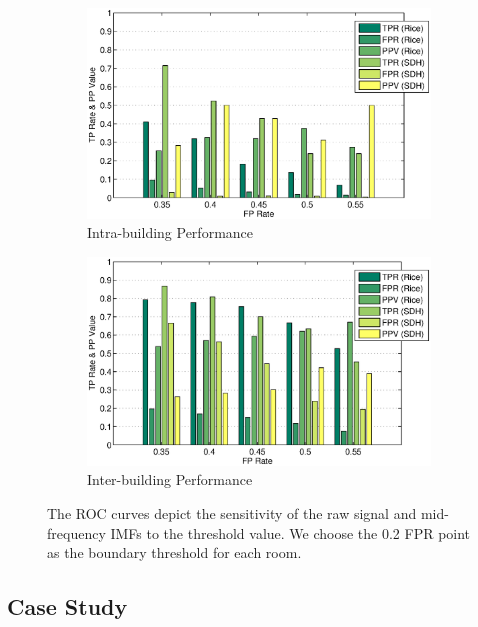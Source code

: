 \begin{figure}[ht!]
\centering
	\begin{subfigure}{0.48\textwidth}
                \centering
		\includegraphics[width=\textwidth]{./fig/roc_intra.eps}
                \caption{Intra-building Performance}
                \label{fig:cdf_intra}
	\end{subfigure}
	\begin{subfigure}{0.48\textwidth}
                \centering
		\includegraphics[width=\textwidth]{./fig/roc_inter.eps}
                \caption{Inter-building Performance}
                \label{fig:cdf_inter}
	\end{subfigure}
\caption{The ROC curves depict the sensitivity of the raw signal and mid-frequency IMFs to the threshold value. We choose the 0.2 FPR point as the boundary threshold for each room. }
\label{fig:cdf}
\end{figure}

\subsection{Case Study}
